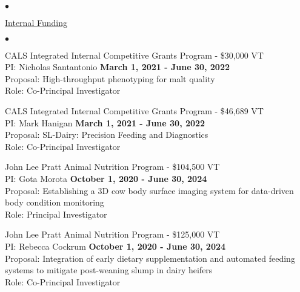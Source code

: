\documentclass[margin,line,10pt]{res}
\newenvironment{list2}{
  \begin{list}{$\bullet$}{%
      \setlength{\itemsep}{0in}
      \setlength{\parsep}{0in} \setlength{\parskip}{0in}
      \setlength{\topsep}{0in} \setlength{\partopsep}{0in} 
      \setlength{\leftmargin}{0.2in}}}{\end{list}}
\begin{document}
\begin{resume}
\begin{list2}
\end{list2}




\begin{flushleft}
\hspace{0.2cm} \underline{Internal Funding}
\end{flushleft}
\begin{list2}

  \item CALS Integrated Internal Competitive Grants Program  - \$30,000  \hfill VT\\
PI: Nicholas Santantonio \hfill \textbf{March 1, 2021 - June 30, 2022}\\
Proposal: High-throughput phenotyping for malt quality\\
Role: Co-Principal Investigator \\

\vspace{0.5cm}


 \item CALS Integrated Internal Competitive Grants Program  - \$46,689  \hfill VT\\
PI: Mark Hanigan \hfill \textbf{March 1, 2021 - June 30, 2022}\\
Proposal: SL-Dairy: Precision Feeding and Diagnostics\\
Role: Co-Principal Investigator \\


\vspace{0.5cm}

\item John Lee Pratt Animal Nutrition Program - \$104,500  \hfill VT\\
PI: Gota Morota \hfill \textbf{October 1, 2020 - June 30, 2024}\\
Proposal: Establishing a 3D cow body surface imaging system for data-driven body condition monitoring\\
Role: Principal Investigator \\


\vspace{0.5cm}


\item John Lee Pratt Animal Nutrition Program - \$125,000  \hfill VT\\
PI: Rebecca Cockrum \hfill \textbf{October 1, 2020 - June 30, 2024}\\
Proposal: Integration of early dietary supplementation and automated feeding systems to mitigate post-weaning slump in dairy heifers\\
Role: Co-Principal Investigator \\


\end{list2}
\end{resume}
\end{document}
